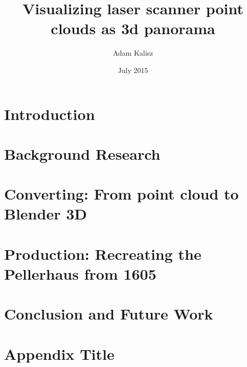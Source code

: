 \documentclass[12pt, twoside, titlepage]{book}
\title{Visualizing laser scanner point clouds as 3d panorama}
\author{Adam Kalisz}
\date{July 2015}
\begin{document}
	
	
	
	\thispagestyle{empty}
	
	
	
	

	\tableofcontents
	
	\listoffigures
	\listoftables
	
	\chapter{Introduction}
	
	\chapter{Background Research}
	
	\chapter{Converting: From point cloud to Blender 3D}
	
	\chapter{Production: Recreating the Pellerhaus from 1605}
	
	\chapter{Conclusion and Future Work}
		
	
	
	\appendix
	\chapter{Appendix Title}
	
	
	\printbibliography
		
\end{document}
